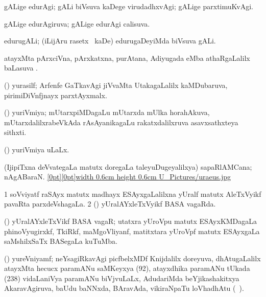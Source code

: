 {{\bentry
{} 
\gl{\kirxvi}
\expl{}
\bmng
gALige edurAgi; gALi biVsuva kaDege virudadhxvAgi; gALige parxtimuKvAgi. 
\emng
\eentry

\bentry
{} 
\gl{\gu}
\expl{}
\bmng
gALige edurAgiruva; gALige edurAgi calisuva. 
\emng
\eentry

\bentry
{} 
\gl{\nA}
\expl{}
\bmng
edurugALi; (iLijAru rasetx \mo\ kaDe) edurugaDeyiMda biVsuva gALi. 
\emng
\eentry

\bentry
{} 
\gl{\sapUpa}
\expl{}
\bmng
atayxMta pArxciVna, pArxkatxna, purAtana, Adiyugada eMba athaRgaLalilx baLasuva \sapUpa. 
\emng
\eentry

\bentry
{} 
\gl{\nA}
\expl{}
\bmng
(\jiVra) yurasilf; Arfenfe GaTkavAgi jiVvaMta UtakagaLalilx kaMDubaruva, pirimiDiVnfjnayx parxtAyxmalx. 
\emng
\eentry

\bentry
{} 
\gl{\nA}
\expl{}
\bmng
(\roVshA) yuriVmiya; mUtarxpiMDagaLu mUtarxda mUlka horahAkuva, mUtarxdalilxrabeVkAda rAsAyanikagaLu rakatxdalilxruva asavxsathxteya sithxti. 
\emng
\eentry

\bentry
{} 
\gl{\gu}
\bmng
(\roVshA) yuriVmiya uLaLx. 
\emng
\eentry

{} 
\gl{\nA}
\expl{}
\bmng
(IjipiTxna deVvategaLa matutx doregaLa taleyuDugeyalilxya) sapaRlAMCana; nAgABaraN. \quad\hyperlink{uraeusfigure}{\raisebox{-0.15cm}[0pt][0pt]{\pdfimage width 0.6cm height 0.6cm {U_Pictures/uraeus.jpg}}} 
\emng
\eentry

\bentry
{} 
\gl{\gu}
\expl{}
\bmng
\bnum
\num{1} soVviyatf raSAyx matutx madhayx ESAyxgaLalilxna yUralf matutx AleTxVyikf pavaRta parxdeVshagaLa. 
\num{2} (\BAshA) yUralAYxleTxVyikf BASA vagaRda. 
\enum
\emng
\eentry

\bentry
{} 
\gl{\nA}
\expl{}
\bmng
(\BAshA) yUralAYxleTxVikf BASA vagaR; utatxra yUroVpu matutx ESAyxKMDagaLa phinoVyugirxkf, TkiRkf, maMgoVliyanf, matitxtara yUroVpf matutx ESAyxgaLa saMshilxSaTx BASegaLa kuTuMba. 
\emng
\eentry

\bentry
{} 
\gl{\nA}
\expl{}
\bmng
(\ravi) yureVniyamf; neYsagiRkavAgi picfbelxMDf Knijdalilx doreyuva, dhAtugaLalilx atayxMta hecucx paramANu saMKeyxya (92), atayxdhika paramANu tUkada (238) vidaLaniVya paramANu biVjvuLaLx, AdudariMda beYjikashakitxya AkaravAgiruva, baUdu baNNxda, BAravAda, vikiraNpaTu loVhadhAtu (\saMkeV\ ). 
\emng
\eentry

}}
